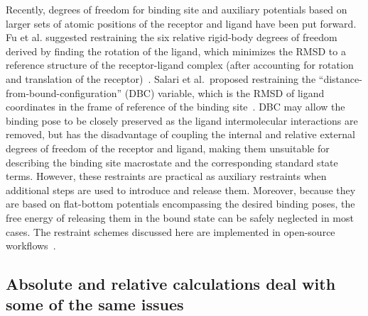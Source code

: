 \documentclass[9pt,bestpractices]{livecoms}
\begin{document}
Recently, degrees of freedom for binding site and auxiliary potentials based on larger sets of atomic positions of the receptor and ligand have been put forward.
Fu et al. suggested restraining the six relative rigid-body degrees of freedom derived by finding the rotation of the ligand, which minimizes the RMSD to a reference structure of the receptor-ligand complex (after accounting for rotation and translation of the receptor)~\cite{fu2017new}. Salari et al.~proposed restraining the ``distance-from-bound-configuration'' (DBC) variable, which is the RMSD of ligand coordinates in the frame of reference of the binding site~\cite{salari2018streamlined, ebrahimi2022symmetry}. DBC may allow the binding pose to be closely preserved as the ligand intermolecular interactions are removed, but has the disadvantage of coupling the internal and relative external degrees of freedom of the receptor and ligand, making them unsuitable for describing the binding site macrostate and the corresponding standard state terms. However, these restraints are practical as auxiliary restraints when additional steps are used to introduce and release them. Moreover, because they are based on flat-bottom potentials encompassing the desired binding poses, the free energy of releasing them in the bound state can be safely neglected in most cases. The restraint schemes discussed here are implemented in open-source workflows~\cite{fu2021bfee2, fu2022accurate, santiago-mcrae2023computing, clark2023comparison, hedges2023suite}.

\subsection{Absolute and relative calculations deal with some of the same issues} 
\end{document}
